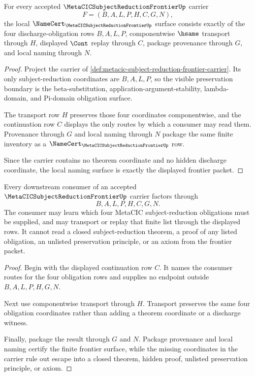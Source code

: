 \begin{theorem}
\label{thm:metacic-subject-reduction-frontier-obligation-surface}
For every accepted $\MetaCICSubjectReductionFrontierUp$ carrier
$$
F=(B,A,L,P,H,C,G,N),
$$
the local $\NameCert_{\MetaCICSubjectReductionFrontierUp}$ surface consists exactly of the four discharge-obligation rows $B,A,L,P$, componentwise $\hsame$ transport through $H$, displayed $\Cont$ replay through $C$, package provenance through $G$, and local naming through $N$.
\end{theorem}
\begin{proof}
Project the carrier of \autoref{def:metacic-subject-reduction-frontier-carrier}. Its only subject-reduction coordinates are $B,A,L,P$, so the visible preservation boundary is the beta-substitution, application-argument-stability, lambda-domain, and Pi-domain obligation surface.

The transport row $H$ preserves those four coordinates componentwise, and the continuation row $C$ displays the only routes by which a consumer may read them. Provenance through $G$ and local naming through $N$ package the same finite inventory as a $\NameCert_{\MetaCICSubjectReductionFrontierUp}$ row.

Since the carrier contains no theorem coordinate and no hidden discharge coordinate, the local naming surface is exactly the displayed frontier packet.
\end{proof}

\begin{theorem}
\label{thm:metacic-subject-reduction-frontier-nonescape}
Every downstream consumer of an accepted $\MetaCICSubjectReductionFrontierUp$ carrier factors through
$$
B,A,L,P,H,C,G,N.
$$
The consumer may learn which four MetaCIC subject-reduction obligations must be supplied, and may transport or replay that finite list through the displayed rows. It cannot read a closed subject-reduction theorem, a proof of any listed obligation, an unlisted preservation principle, or an axiom from the frontier packet.
\end{theorem}
\begin{proof}
Begin with the displayed continuation row $C$. It names the consumer routes for the four obligation rows and supplies no endpoint outside $B,A,L,P,H,G,N$.

Next use componentwise transport through $H$. Transport preserves the same four obligation coordinates rather than adding a theorem coordinate or a discharge witness.

Finally, package the result through $G$ and $N$. Package provenance and local naming certify the finite frontier surface, while the missing coordinates in the carrier rule out escape into a closed theorem, hidden proof, unlisted preservation principle, or axiom.
\end{proof}

